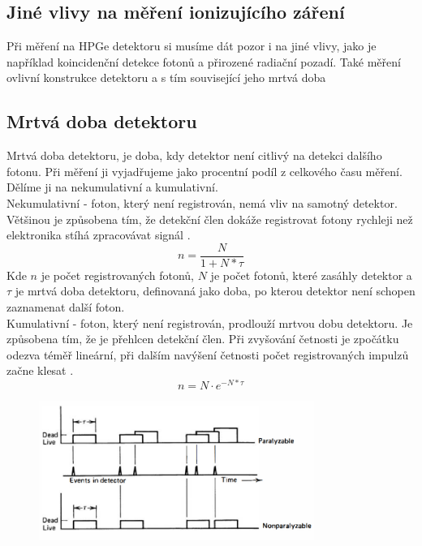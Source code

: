 \documentclass[12pt,a4paper]{article}
\begin{document}
\begin{spacing}{1.5}
\section{Jiné vlivy na měření ionizujícího záření}
Při měření na HPGe detektoru si musíme dát pozor i na jiné vlivy, jako je například koincidenční detekce fotonů a přirozené radiační pozadí. Také měření ovlivní konstrukce detektoru a s tím související jeho mrtvá doba
\subsection{Mrtvá doba detektoru}
Mrtvá doba detektoru, je doba, kdy detektor není citlivý na detekci dalšího fotonu. Při měření ji vyjadřujeme jako procentní podíl z celkového času měření.\\
Dělíme ji na nekumulativní a kumulativní. \\
Nekumulativní - foton, který není registrován, nemá vliv na samotný detektor. Většinou je způsobena tím, že detekční člen dokáže registrovat fotony rychleji než elektronika stíhá zpracovávat signál \cite{VUT}. %
\begin{equation}
	n = \frac{N}{1+N*\tau}
\end{equation}
Kde $n$ je počet registrovaných fotonů, $N$ je počet fotonů, které zasáhly detektor a  $\tau$ je mrtvá doba detektoru, definovaná jako doba, po kterou detektor není schopen zaznamenat další foton.\\
Kumulativní - foton, který není registrován, prodlouží mrtvou dobu detektoru. Je způsobena tím, že je přehlcen detekční člen. Při zvyšování četnosti je zpočátku odezva téměř lineární, \break při dalším navýšení četnosti počet registrovaných impulzů začne klesat \cite{VUT}. 
\begin{equation}
	n = N \cdot e^{-N*\tau}
\end{equation}
\begin{figure}[H]
	\centering
	\setcounter{figure}{0}
	\includegraphics[width=0.8\textwidth]{fig1.png}

\end{figure}
\end{spacing}
\end{document}
